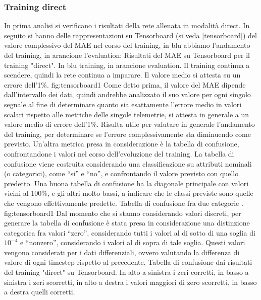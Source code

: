 \subsubsection{Training direct}
In prima analisi si verificano i risultati della rete allenata in modalità direct. In seguito si hanno delle rappresentazioni su Tensorboard (si veda \ref{tensorboard}) del valore complessivo del MAE nel corso del training, in blu abbiamo l’andamento del training, in arancione l’evaluation:
{Risultati del MAE su Tensorboard per il training "direct". In blu training, in arancione evaluation. Il training continua a scendere, quindi la rete continua a imparare. Il valore medio si attesta su un errore dell'1\%. }
{fig:tensorboard1}
Come detto prima, il valore del MAE dipende dall'intervallo dei dati, quindi andrebbe analizzato il suo valore per ogni singolo segnale al fine di determinare quanto sia esattamente l’errore medio in valori scalari rispetto alle metriche delle singole telemetrie, si attesta in generale a un valore medio di errore dell'1\%. Risulta utile per valutare in generale l’andamento del training, per determinare se l’errore complessivamente sta diminuendo come previsto.
Un’altra metrica presa in considerazione è la tabella di confusione, confrontandone i valori nel corso dell’evoluzione del training. La tabella di confusione viene costruita considerando una classificazione su attributi nominali (o categorici), come “si” e “no”, e confrontando il valore previsto con quello predetto.
Una buona tabella di confusione ha la diagonale principale con valori vicini al 100\%, e gli altri molto bassi, a indicare che le classi previste sono quelle che vengono effettivamente predette.
{Tabella di confusione fra due categorie \cite{witten}.}
{fig:tensorboard1}
Dal momento che si stanno considerando valori discreti, per generare la tabella di confusione è stata presa in considerazione una distinzione categorica fra valori “zero”, considerando tutti i valori al di sotto di una soglia di $ 10^{-4} $  e “nonzero”, considerando i valori al di sopra di tale soglia. Questi valori vengono considerati per i dati differenziali, ovvero valutando la differenza di valore di ogni timestep rispetto al precedente.
{Tabella di confusione dai risultati del training "direct" su Tensorboard. In alto a sinistra i zeri corretti, in basso a sinistra i zeri scorretti, in alto a destra i valori maggiori di zero scorretti, in basso a destra quelli corretti.} %
